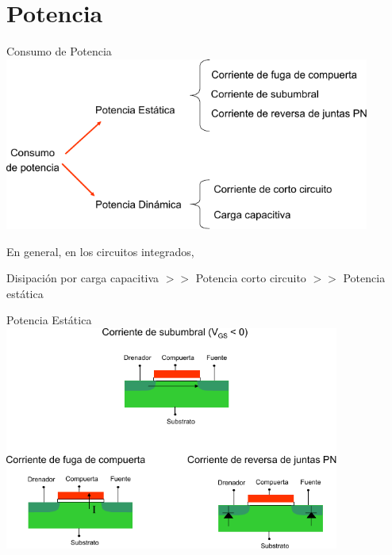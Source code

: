 \documentclass[aspectratio=169,t]{beamer}
\begin{document}
\section{Potencia}
\begin{frame}{Consumo de Potencia}
\centering
\includegraphics[width=12cm]{power}

\raggedright
En general, en los circuitos integrados,

Disipación por carga capacitiva $>>$ Potencia corto circuito $>>$ Potencia estática
\end{frame}


\begin{frame}{Potencia Estática}
\centering
\includegraphics[width=11cm]{pstatic}
\end{frame}
\end{document}
